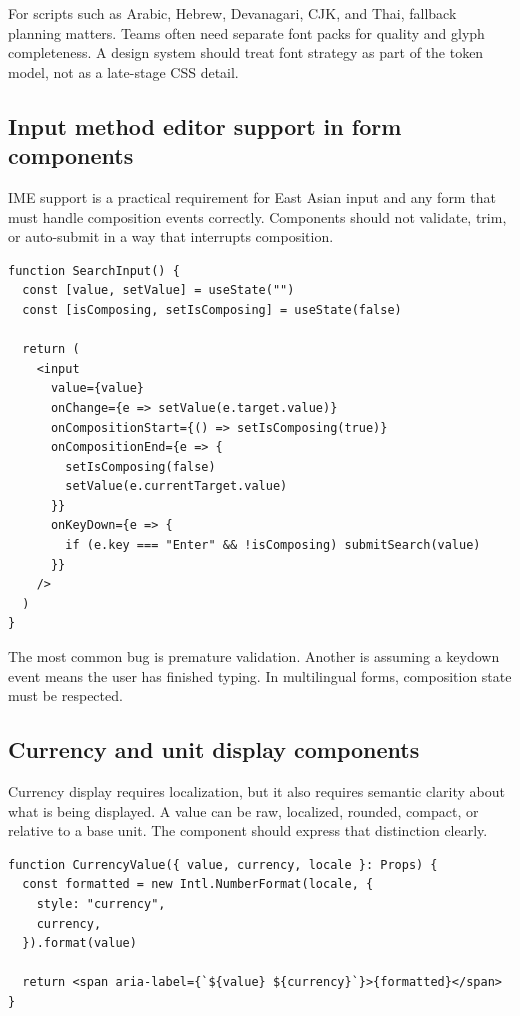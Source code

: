 For scripts such as Arabic, Hebrew, Devanagari, CJK, and Thai, fallback planning matters. Teams often need separate font packs for quality and glyph completeness. A design system should treat font strategy as part of the token model, not as a late-stage CSS detail.

\subsection{Input method editor support in form components}
IME support is a practical requirement for East Asian input and any form that must handle composition events correctly. Components should not validate, trim, or auto-submit in a way that interrupts composition.

\begin{verbatim}
function SearchInput() {
  const [value, setValue] = useState("")
  const [isComposing, setIsComposing] = useState(false)

  return (
    <input
      value={value}
      onChange={e => setValue(e.target.value)}
      onCompositionStart={() => setIsComposing(true)}
      onCompositionEnd={e => {
        setIsComposing(false)
        setValue(e.currentTarget.value)
      }}
      onKeyDown={e => {
        if (e.key === "Enter" && !isComposing) submitSearch(value)
      }}
    />
  )
}
\end{verbatim}

The most common bug is premature validation. Another is assuming a keydown event means the user has finished typing. In multilingual forms, composition state must be respected.

\subsection{Currency and unit display components}
Currency display requires localization, but it also requires semantic clarity about what is being displayed. A value can be raw, localized, rounded, compact, or relative to a base unit. The component should express that distinction clearly.

\begin{verbatim}
function CurrencyValue({ value, currency, locale }: Props) {
  const formatted = new Intl.NumberFormat(locale, {
    style: "currency",
    currency,
  }).format(value)

  return <span aria-label={`${value} ${currency}`}>{formatted}</span>
}
\end{verbatim}

